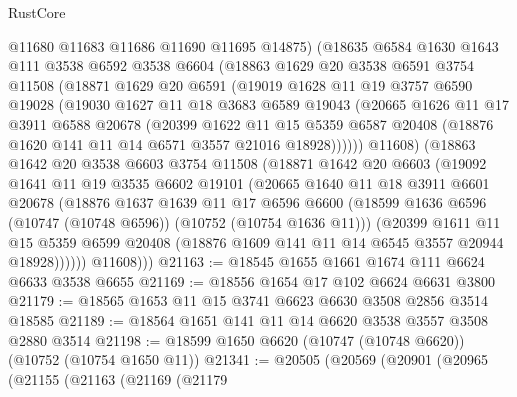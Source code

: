 \begin{lexlean}{RustCore}
\begin{coremodule}
        @11680
        @11683
        @11686
        @11690
        @11695
        @14875)
      (@18635
        @6584
        @1630
        @1643
        @111
        @3538
        @6592
        @3538
        @6604
        (@18863
          @1629
          @20
          @3538
          @6591
          @3754
          @11508
          (@18871
            @1629
            @20
            @6591
            (@19019
              @1628
              @11
              @19
              @3757
              @6590
              @19028
              (@19030
                @1627
                @11
                @18
                @3683
                @6589
                @19043
                (@20665
                  @1626
                  @11
                  @17
                  @3911
                  @6588
                  @20678
                  (@20399
                    @1622
                    @11
                    @15
                    @5359
                    @6587
                    @20408
                    (@18876 @1620 @141 @11 @14 @6571 @3557 @21016 @18928))))))
          @11608)
        (@18863
          @1642
          @20
          @3538
          @6603
          @3754
          @11508
          (@18871
            @1642
            @20
            @6603
            (@19092
              @1641
              @11
              @19
              @3535
              @6602
              @19101
              (@20665
                @1640
                @11
                @18
                @3911
                @6601
                @20678
                (@18876
                  @1637
                  @1639
                  @11
                  @17
                  @6596
                  @6600
                  (@18599 @1636 @6596 (@10747 (@10748 @6596)) (@10752 (@10754 @1636 @11)))
                  (@20399
                    @1611
                    @11
                    @15
                    @5359
                    @6599
                    @20408
                    (@18876 @1609 @141 @11 @14 @6545 @3557 @20944 @18928))))))
          @11608)))
@21163 := @18545 @1655 @1661 @1674 @111 @6624 @6633 @3538 @6655
@21169 := @18556 @1654 @17 @102 @6624 @6631 @3800
@21179 := @18565 @1653 @11 @15 @3741 @6623 @6630 @3508 @2856 @3514 @18585
@21189 := @18564 @1651 @141 @11 @14 @6620 @3538 @3557 @3508 @2880 @3514
@21198 := @18599 @1650 @6620 (@10747 (@10748 @6620)) (@10752 (@10754 @1650 @11))
@21341 := @20505
    (@20569
      (@20901
        (@20965
          (@21155
            (@21163
              (@21169
                (@21179

\end{coremodule}
\end{lexlean}
